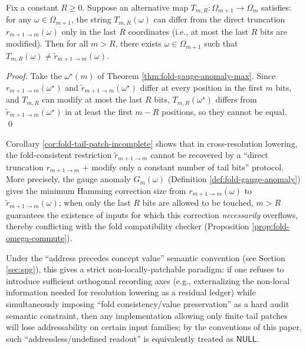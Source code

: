 \begin{corollary}\label{cor:fold-tail-patch-incomplete}
Fix a constant \(R\ge 0\). Suppose an alternative map \(T_{m,R}:\Omega_{m+1}\to\Omega_m\) satisfies: for any \(\omega\in\Omega_{m+1}\), the string \(T_{m,R}(\omega)\) can differ from the direct truncation \(r_{m+1\to m}(\omega)\) only in the last \(R\) coordinates (i.e., at most the last \(R\) bits are modified).
Then for all \(m>R\), there exists \(\omega\in\Omega_{m+1}\) such that \(T_{m,R}(\omega)\ne \widetilde r_{m+1\to m}(\omega)\).
\end{corollary}

\begin{proof}
Take the \(\omega^\star(m)\) of Theorem \ref{thm:fold-gauge-anomaly-max}.
Since \(r_{m+1\to m}(\omega^\star)\) and \(\widetilde r_{m+1\to m}(\omega^\star)\) differ at every position in the first \(m\) bits, and \(T_{m,R}\) can modify at most the last \(R\) bits, \(T_{m,R}(\omega^\star)\) differs from \(\widetilde r_{m+1\to m}(\omega^\star)\) in at least the first \(m-R\) positions, so they cannot be equal. \qed
\end{proof}

\begin{remark}\label{rem:fold-tail-patch-null-nonlocal}
Corollary \ref{cor:fold-tail-patch-incomplete} shows that in cross-resolution lowering, the fold-consistent restriction \(\widetilde r_{m+1\to m}\) cannot be recovered by a ``direct truncation \(r_{m+1\to m}\) + modify only a constant number of tail bits'' protocol.
More precisely, the gauge anomaly \(G_m(\omega)\) (Definition \ref{def:fold-gauge-anomaly}) gives the minimum Hamming correction size from \(r_{m+1\to m}(\omega)\) to \(\widetilde r_{m+1\to m}(\omega)\); when only the last \(R\) bits are allowed to be touched, \(m>R\) guarantees the existence of inputs for which this correction \emph{necessarily} overflows, thereby conflicting with the fold compatibility checker (Proposition \ref{prop:fold-omega-commute}).
\par
Under the ``address precedes concept value'' semantic convention (see Section \ref{sec:spg}), this gives a strict non-locally-patchable paradigm:
if one refuses to introduce sufficient orthogonal recording axes (e.g., externalizing the non-local information needed for resolution lowering as a residual ledger) while simultaneously imposing ``fold consistency/value preservation'' as a hard audit semantic constraint, then any implementation allowing only finite tail patches will lose addressability on certain input families;
by the conventions of this paper, such ``addressless/undefined readout'' is equivalently treated as \(\mathsf{NULL}\).
\end{remark}

